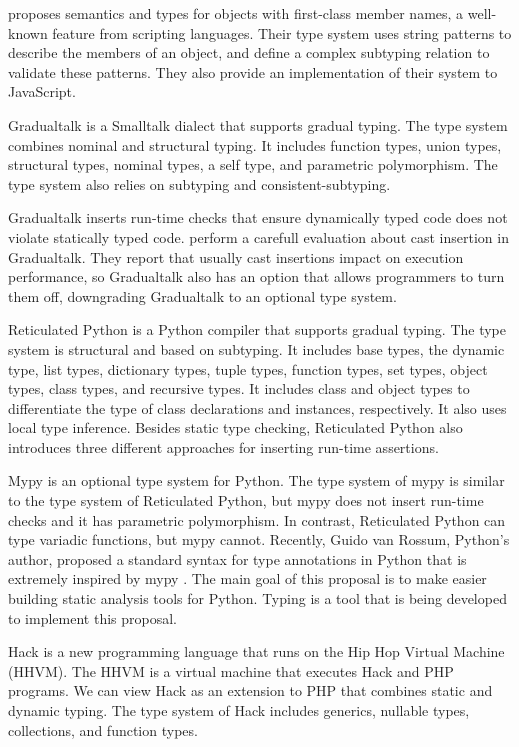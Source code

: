 \citet{politz2012semantics} proposes semantics and types for objects
with first-class member names, a well-known feature from scripting languages.
Their type system uses string patterns to describe the members of
an object, and define a complex subtyping relation to validate
these patterns.
They also provide an implementation of their system to JavaScript.

Gradualtalk \citep{allende2013gts} is a Smalltalk dialect that
supports gradual typing.
The type system combines nominal and structural typing.
It includes function types, union types, structural types,
nominal types, a self type, and parametric polymorphism.
The type system also relies on subtyping and consistent-subtyping.

Gradualtalk inserts run-time checks that ensure dynamically
typed code does not violate statically typed code.
\citet{allende2013cis} perform a carefull evaluation about
cast insertion in Gradualtalk.
They report that usually cast insertions impact on execution
performance, so Gradualtalk also has an option that allows
programmers to turn them off, downgrading Gradualtalk
to an optional type system.

Reticulated Python \citep{vitousek2014deg} is a Python compiler
that supports gradual typing.
The type system is structural and based on subtyping.
It includes base types, the dynamic type, list types,
dictionary types, tuple types, function types, set types,
object types, class types, and recursive types.
It includes class and object types to differentiate the
type of class declarations and instances, respectively.
It also uses local type inference.
Besides static type checking, Reticulated Python also introduces
three different approaches for inserting run-time assertions.

Mypy \citep{mypy} is an optional type system for Python.
The type system of mypy is similar to the type system of
Reticulated Python, but mypy does not insert run-time checks
and it has parametric polymorphism.
In contrast, Reticulated Python can type variadic functions,
but mypy cannot.
Recently, Guido van Rossum, Python's author, proposed a
standard syntax for type annotations in Python \citep{PEP483}
that is extremely inspired by mypy \citep{PEP484}.
The main goal of this proposal is to make easier building
static analysis tools for Python.
Typing \citep{typing} is a tool that is being developed to
implement this proposal.

Hack \citep{hack} is a new programming language that runs on the
Hip Hop Virtual Machine (HHVM).
The HHVM is a virtual machine that executes Hack and PHP programs.
We can view Hack as an extension to PHP that combines static and
dynamic typing.
The type system of Hack includes generics, nullable types, collections,
and function types.

